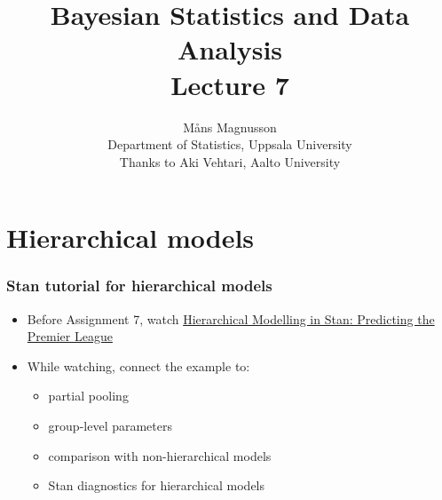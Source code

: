 \documentclass[10pt]{beamer}
\title[]{{\color{black}Bayesian Statistics and Data Analysis \\ Lecture 7}}
\author[]{M{\aa}ns Magnusson \\ Department of Statistics, Uppsala University \\ Thanks to Aki Vehtari, Aalto University}
\date{}
\begin{document}
\frame{\titlepage
}


\section{Hierarchical models}
\frame{\sectionpage}

\begin{frame}

\frametitle{Stan tutorial for hierarchical models}

  \begin{itemize}
  \item Before Assignment 7, watch
    \href{https://www.youtube.com/watch?v=dNZQrcAjgXQ}{Hierarchical Modelling in Stan: Predicting the Premier League}
  \item While watching, connect the example to:
    \begin{itemize}
    \item partial pooling
    \item group-level parameters
    \item comparison with non-hierarchical models
    \item Stan diagnostics for hierarchical models
    \end{itemize}
  \end{itemize}

\end{frame}
\end{document}
